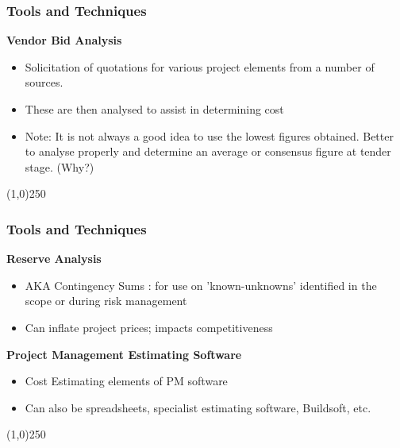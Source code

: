 \begin{frame}
\frametitle{Tools and Techniques}
 
\textbf{Vendor Bid Analysis}
	\begin{itemize}
		\item Solicitation of quotations for various project elements from a number of sources.
		\item These are then analysed to assist in determining cost
		\item Note: It is not always a good idea to use the lowest figures obtained.  Better to analyse properly and determine an average or consensus figure at tender stage. (Why?)
	\end{itemize}
\end{frame}
\begin{center}\line(1,0){250}\end{center}


\begin{frame}
\frametitle{Tools and Techniques}
\textbf{Reserve Analysis}
\begin{itemize}
	\item AKA Contingency Sums : for use on 'known-unknowns' identified in the scope or during risk management
	\item Can inflate project prices; impacts competitiveness
\end{itemize}
\textbf{Project Management Estimating Software}
\begin{itemize}
	\item Cost Estimating elements of PM software
	\item Can also be spreadsheets, specialist estimating software, Buildsoft, etc. 
\end{itemize}
\end{frame}
\begin{center}\line(1,0){250}\end{center}






